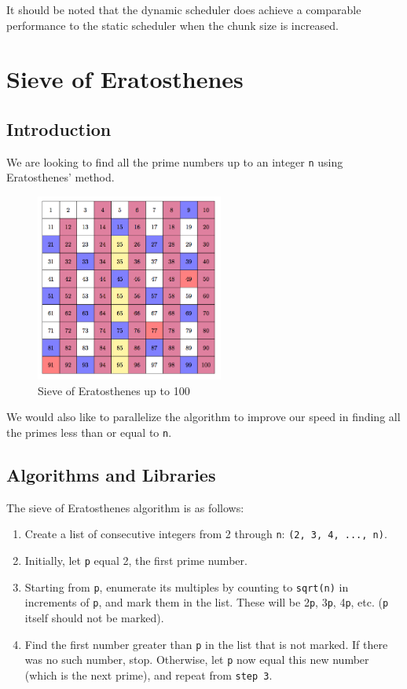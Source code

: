 \documentclass{article}
\begin{document}
\noindent 
It should be noted that the dynamic scheduler does achieve a comparable performance to the static scheduler when the chunk size is increased.

\newpage

\section{Sieve of Eratosthenes}

\subsection{Introduction}
We are looking to find all the prime numbers up to an integer \texttt{n} using Eratosthenes' method. 

\begin{figure}[ht]
    \centering
    \includegraphics[width=0.55\textwidth]{sieve.png}
    \caption{Sieve of Eratosthenes up to 100}
    \label{fig:sieve}
\end{figure}

We would also like to parallelize the algorithm to improve our speed in finding all the primes less than or equal to \texttt{n}.

\subsection{Algorithms and Libraries}
The sieve of Eratosthenes algorithm is as follows:
\begin{enumerate}
    \item Create a list of consecutive integers from 2 through \texttt{n}: \texttt{(2, 3, 4, ..., n)}.
    
    \item Initially, let \texttt{p} equal 2, the first prime number.
    
    \item Starting from \texttt{p}, enumerate its multiples by counting to \texttt{sqrt(n)} in increments of \texttt{p}, and mark them in the list. These will be 2\texttt{p}, 3\texttt{p}, 4\texttt{p}, etc. (\texttt{p} itself should not be marked).
    
    \item Find the first number greater than \texttt{p} in the list that is not marked. If there was no such number, stop. Otherwise, let \texttt{p} now equal this new number (which is the next prime), and repeat from \texttt{step 3}.
\end{enumerate}
\end{document}
